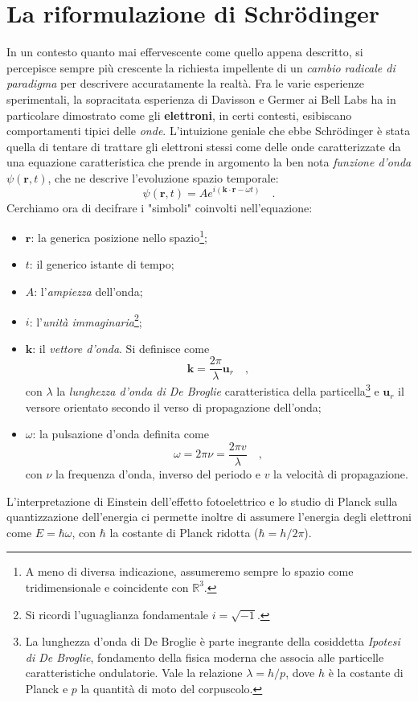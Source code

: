 \section{La riformulazione di Schrödinger}
In un contesto quanto mai effervescente come quello appena descritto, si percepisce sempre più crescente la richiesta impellente di un \emph{cambio radicale di paradigma} per descrivere accuratamente la realtà. Fra le varie esperienze sperimentali, la sopracitata esperienza di Davisson e Germer ai Bell Labs ha in particolare dimostrato come gli \textbf{elettroni}, in certi contesti, esibiscano comportamenti tipici delle \emph{onde}. L'intuizione geniale che ebbe Schrödinger è stata quella di tentare di trattare gli elettroni stessi come delle onde caratterizzate da una equazione caratteristica che prende in argomento la ben nota \emph{funzione d'onda} $\psi(\bm{r},t)$, che ne descrive l'evoluzione spazio temporale:
\begin{equation}
    \psi(\bm{r},t) = A e^{i(\bm{k}\cdot\bm{r}- \omega t)} \quad.
    \label{eq:func_onda}
\end{equation}
Cerchiamo ora di decifrare i "simboli" coinvolti nell'equazione:
\begin{itemize}[noitemsep]
    \item $\bm{r}$: la generica posizione nello spazio\footnote{A meno di diversa indicazione, assumeremo sempre lo spazio come tridimensionale e coincidente con $\mathbb{R}^3$.};
    \item $t$: il generico istante di tempo;
    \item $A$: l'\emph{ampiezza} dell'onda;
    \item $i$: l'\emph{unità immaginaria}\footnote{Si ricordi l'uguaglianza fondamentale $i = \sqrt{-1}$.};
    \item $\bm{k}$: il \emph{vettore d'onda}. Si definisce come
    \[
        \bm{k} = \frac{2\pi}{\lambda} \bm{{u}}_r \quad,
    \]
    con $\lambda$ la \emph{lunghezza d'onda di De Broglie} caratteristica della particella\footnote{La lunghezza d'onda di De Broglie è parte inegrante della cosiddetta \emph{Ipotesi di De Broglie}, fondamento della fisica moderna che associa alle particelle caratteristiche ondulatorie. Vale la relazione $\lambda = {h}/{p}$, dove $h$ è la costante di Planck e $p$ la quantità di moto del corpuscolo.} e $\bm{{u}}_r$ il versore orientato secondo il verso di propagazione dell'onda; 
    \item $\omega$: la pulsazione d'onda definita come
    \[
        \omega = 2\pi\nu = \frac{2\pi v}{\lambda} \quad,
    \]
    con $\nu$ la frequenza d'onda, inverso del periodo e $v$ la velocità di propagazione.
\end{itemize}
L'interpretazione di Einstein dell'effetto fotoelettrico e lo studio di Planck sulla quantizzazione dell'energia ci permette inoltre di assumere l'energia degli elettroni come $E = \hbar \omega$, con $\hbar$ la costante di Planck ridotta ($\hbar = h/2\pi$). 

